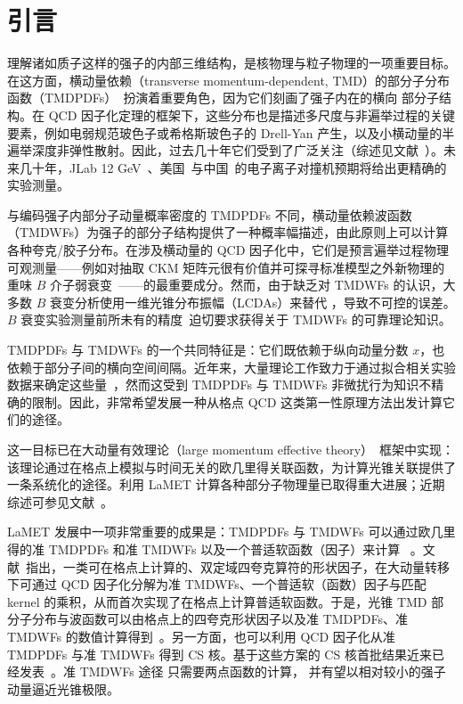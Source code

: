 \section{引言}

理解诸如质子这样的强子的内部三维结构，是核物理与粒子物理的一项重要目标。在这方面，横动量依赖（transverse momentum-dependent, TMD）的部分子分布函数（TMDPDFs）~\cite{Collins:1981uk,Collins:1981va}扮演着重要角色，因为它们刻画了强子内在的横向
部分子结构。在 QCD 因子化定理的框架下，这些分布也是描述多尺度与非遍举过程的关键要素，例如电弱规范玻色子或希格斯玻色子的 Drell-Yan 产生，以及小横动量的半遍举深度非弹性散射。因此，过去几十年它们受到了广泛关注（综述见文献~\cite{Angeles-Martinez:2015sea}）。未来几十年，JLab 12 GeV~\cite{Dudek:2012vr}、美国~\cite{Accardi:2012qut,AbdulKhalek:2021gbh}与中国~\cite{Anderle:2021wcy}的电子离子对撞机预期将给出更精确的实验测量。


与编码强子内部分子动量概率密度的 TMDPDFs 不同，横动量依赖波函数（TMDWFs）为强子的部分子结构提供了一种概率幅描述，由此原则上可以计算各种夸克/胶子分布。在涉及横动量的 QCD 因子化中，它们是预言遍举过程物理可观测量——例如对抽取 CKM 矩阵元很有价值并可探寻标准模型之外新物理的重味 $B$ 介子弱衰变~\cite{Keum:2000wi,Lu:2000em}——的最重要成分。然而，由于缺乏对 TMDWFs 的认识，大多数 $B$ 衰变分析使用一维光锥分布振幅（LCDAs）来替代 \cite{Keum:2000wi,Lu:2000em,Nagashima:2002ia}，导致不可控的误差。$B$ 衰变实验测量前所未有的精度~\cite{Cerri:2018ypt}迫切要求获得关于 TMDWFs 的可靠理论知识。

TMDPDFs 与 TMDWFs 的一个共同特征是：它们既依赖于纵向动量分数 $x$，也依赖于部分子间的横向空间间隔。近年来，大量理论工作致力于通过拟合相关实验数据来确定这些量~\cite{Landry:1999an,Landry:2002ix,DAlesio:2014mrz,Sun:2014dqm,Konychev:2005iy,Bacchetta:2017gcc,Scimemi:2017etj,Scimemi:2019cmh,Bacchetta:2019sam}，然而这受到 TMDPDFs 与 TMDWFs 非微扰行为知识不精确的限制。因此，非常希望发展一种从格点 QCD 这类第一性原理方法出发计算它们的途径。

这一目标已在大动量有效理论（large momentum effective theory）~\cite{Ji:2013dva,Ji:2014gla}框架中实现：该理论通过在格点上模拟与时间无关的欧几里得关联函数，为计算光锥关联提供了一条系统化的途径。利用 LaMET 计算各种部分子物理量已取得重大进展；近期综述可参见文献~\cite{Cichy:2018mum,Ji:2020ect}。

LaMET 发展中一项非常重要的成果是：TMDPDFs 与 TMDWFs 可以通过欧几里得的准 TMDPDFs 和准 TMDWFs 以及一个普适软函数（因子）来计算 ~\cite{Ebert:2019okf,Ji:2019sxk,Ji:2019ewn,Ji:2021znw}。文献~\cite{Ji:2019sxk}指出，一类可在格点上计算的、双定域四夸克算符的形状因子，在大动量转移下可通过 QCD 因子化分解为准 TMDWFs、一个普适软（函数）因子与匹配 kernel 的乘积，从而首次实现了在格点上计算普适软函数。于是，光锥 TMD 部分子分布与波函数可以由格点上的四夸克形状因子以及准 TMDPDFs、准 TMDWFs 的数值计算得到~\cite{Ji:2019sxk,Ji:2019ewn}。另一方面，也可以利用 QCD 因子化从准 TMDPDFs 与准 TMDWFs 得到 CS 核。基于这些方案的 CS 核首批结果近来已经发表~\cite{Shanahan:2020zxr,LatticeParton:2020uhz,Schlemmer:2021aij,Li:2021wvl,Shanahan:2021tst}。准 TMDWFs 途径
只需要两点函数的计算，
并有望以相对较小的强子动量逼近光锥极限。

